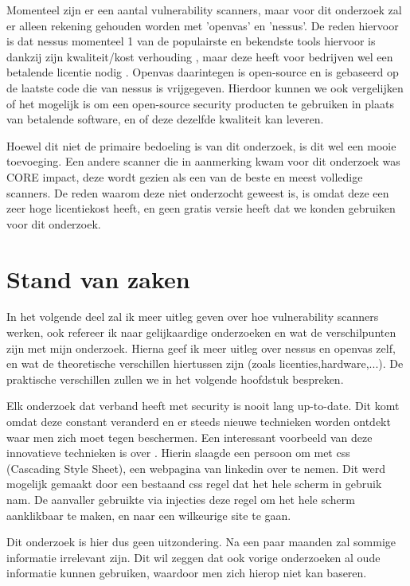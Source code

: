 Momenteel zijn er een aantal vulnerability scanners, maar voor dit onderzoek zal er alleen rekening gehouden worden met 'openvas' en 'nessus'. De reden hiervoor is dat nessus momenteel 1 van de populairste en bekendste tools hiervoor is dankzij zijn kwaliteit/kost verhouding \textcite{Sectools}, maar deze heeft voor bedrijven wel een betalende licentie nodig \textcite{Tenable}. Openvas daarintegen is open-source en is gebaseerd op de laatste code die van nessus is vrijgegeven. Hierdoor kunnen we ook vergelijken of het mogelijk is om een open-source security producten te gebruiken in plaats van betalende software, en of deze dezelfde kwaliteit kan leveren. 

Hoewel dit niet de primaire bedoeling is van dit onderzoek, is dit wel een mooie toevoeging. Een andere scanner die in aanmerking kwam voor dit onderzoek was CORE impact, deze wordt gezien als een van de beste en meest volledige scanners. De reden waarom deze niet onderzocht geweest is, is omdat deze een zeer hoge licentiekost heeft, en geen gratis versie heeft dat we konden gebruiken voor dit onderzoek.

\section{Stand van zaken}
\label{sec:stand-van-zaken}

In het volgende deel zal ik meer uitleg geven over hoe vulnerability scanners werken, ook refereer ik naar gelijkaardige onderzoeken en wat de verschilpunten zijn met mijn onderzoek. Hierna geef ik meer uitleg over nessus en openvas zelf, en wat de theoretische verschillen hiertussen zijn (zoals licenties,hardware,...).  De praktische verschillen zullen we in het volgende hoofdstuk bespreken.

Elk onderzoek dat verband heeft met security is nooit lang up-to-date. Dit komt omdat deze constant veranderd en er steeds nieuwe technieken worden ontdekt waar men zich moet tegen beschermen. Een interessant voorbeeld van deze innovatieve technieken is over \textcite{Linkedin}. Hierin slaagde een persoon om met css (Cascading Style Sheet), een webpagina van linkedin over te nemen. Dit werd mogelijk gemaakt door een bestaand css regel dat het hele scherm in gebruik nam. De aanvaller gebruikte via injecties deze regel om het hele scherm aanklikbaar te maken, en naar een wilkeurige site te gaan.

Dit onderzoek is hier dus geen uitzondering. Na een paar maanden zal sommige informatie irrelevant zijn. Dit wil zeggen dat ook vorige onderzoeken al oude informatie kunnen gebruiken, waardoor men zich hierop niet kan baseren.


